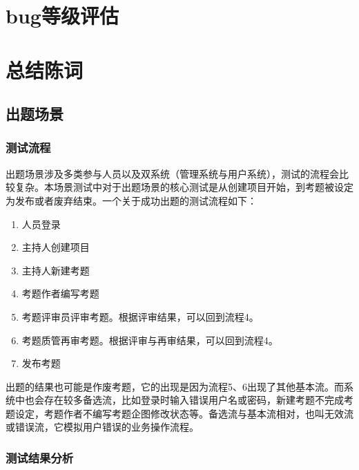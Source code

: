 \documentclass[hyperref, a4paper]{ctexart}
\begin{document}
\hypertarget{bugux7b49ux7ea7ux8bc4ux4f30}{%
\section{bug等级评估}\label{bugux7b49ux7ea7ux8bc4ux4f30}}

\hypertarget{ux603bux7ed3ux9648ux8bcd}{%
\section{总结陈词}\label{ux603bux7ed3ux9648ux8bcd}}

\hypertarget{ux51faux9898ux573aux666f-2}{%
\subsection{出题场景}\label{ux51faux9898ux573aux666f-2}}

\hypertarget{ux6d4bux8bd5ux6d41ux7a0b}{%
\subsubsection{测试流程}\label{ux6d4bux8bd5ux6d41ux7a0b}}

出题场景涉及多类参与人员以及双系统（管理系统与用户系统），测试的流程会比较复杂。本场景测试中对于出题场景的核心测试是从创建项目开始，到考题被设定为发布或者废弃结束。一个关于成功出题的测试流程如下：

\begin{enumerate}
\def\labelenumi{\arabic{enumi}.}
\item
  人员登录
\item
  主持人创建项目
\item
  主持人新建考题
\item
  考题作者编写考题
\item
  考题评审员评审考题。根据评审结果，可以回到流程4。
\item
  考题质管再审考题。根据评审与再审结果，可以回到流程4。
\item
  发布考题
\end{enumerate}

出题的结果也可能是作废考题，它的出现是因为流程5、6出现了其他基本流。而系统中也会存在较多备选流，比如登录时输入错误用户名或密码，新建考题不完成考题设定，考题作者不编写考题企图修改状态等。备选流与基本流相对，也叫无效流或错误流，它模拟用户错误的业务操作流程。

\hypertarget{ux6d4bux8bd5ux7ed3ux679cux5206ux6790}{%
\subsubsection{测试结果分析}\label{ux6d4bux8bd5ux7ed3ux679cux5206ux6790}}
\end{document}
